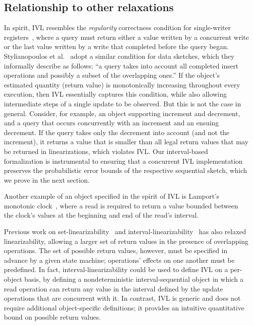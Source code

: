 \subsection{Relationship to other relaxations}
\label{ivl-ssec:comparisons}

In spirit, IVL resembles the \emph{regularity} correctness condition for
single-writer registers~\cite{lamport1986interprocess}, where a query must return
either a value written by a concurrent write or the last value written
by a write that completed before the query began. Stylianopoulos  
et al.~\cite{stylianopoulos2020delegation} adopt a similar condition for data sketches, which they
informally describe as follows: ``a query takes into account all completed
insert operations and possibly a subset of the overlapping ones.''
If the object's estimated quantity (return value) is monotonically increasing
throughout every execution, then IVL essentially captures this condition,
while also allowing intermediate steps of a single update to be observed.
But this is not the case in general. Consider, for example, an
object supporting increment and decrement, and a query that occurs concurrently
with an increment and an ensuing decrement. If the query takes only the decrement
into account (and not the increment), it returns a value that is smaller than all legal return values
that may be returned in linearizations, which violates IVL. Our interval-based
formalization is instrumental to ensuring that a concurrent IVL implementation
preserves the probabilistic error bounds of the respective sequential sketch, which we prove in the next section.

Another example of an object specified in the spirit of IVL is Lamport's monotonic
clock~\cite{lamport1990concurrent}, where a read is required to return a value bounded between the clock's
values at the beginning and end of the read’s interval.

Previous work on set-linearizability~\cite{neiger1994set} and
interval-linearizability~\cite{castaneda2018unifying} has also relaxed linearizability,
allowing a larger set of return values in the presence of overlapping operations. The set of possible return
values, however, must be specified in advance by a given state machine; operations' effects
on one another must be predefined.
In fact, interval-linearizability could be used to define IVL on a per-object basis, by defining
a nondeterministic interval-sequential object in which a read operation can return any value in
the interval defined by the update operations that are concurrent with it. In
contrast,  IVL is generic and does not require
additional object-specific definitions; it provides an intuitive quantitative bound
on possible return values.

